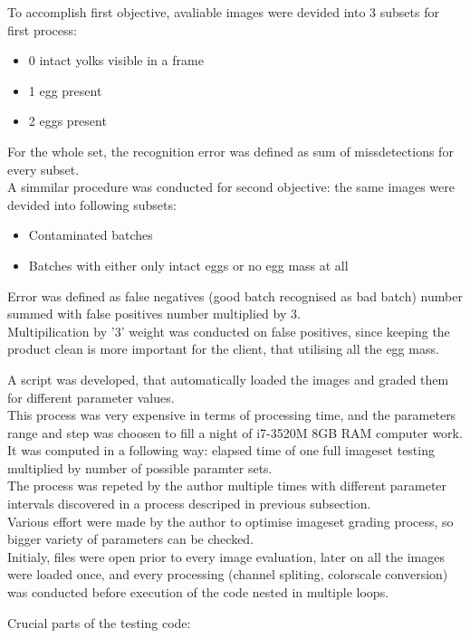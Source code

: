 \documentclass[12pt,twoside,a4paper]{article}
\begin{document}
To accomplish first objective, avaliable images were devided into 3 subsets for first process:\\
\begin{itemize}
\item 0 intact yolks visible in a frame
\item 1 egg present
\item 2 eggs present
\end{itemize}
For the whole set, the recognition error was defined  as sum of missdetections for every subset.\\
A simmilar procedure was conducted for second objective: the same images were devided into following subsets:
\begin{itemize}
\item Contaminated batches
\item Batches with either only intact eggs or no egg mass at all
\end{itemize}
Error was defined as false negatives (good batch recognised as bad batch) number summed with false positives number multiplied by 3.\\
Multipilication by '3' weight was conducted on false positives, since keeping the product clean is more important for the client, that utilising all the egg mass. 

A script was developed, that automatically loaded the images and graded them for different parameter values.\\
This process was very expensive in terms of processing time, and the parameters range and step was choosen to fill a night of i7-3520M 8GB RAM computer work.\\
It was computed in a following way: elapsed time of one full imageset testing multiplied by number of possible paramter sets.\\
The process was repeted by the author multiple times with different parameter intervals discovered in a process descriped in previous subsection.\\
Various effort were made by the author to optimise imageset grading process, so bigger variety of parameters can be checked.\\
Initialy, files were open prior to every image evaluation, later on all the images were loaded once, and every processing (channel spliting, colorscale conversion) was conducted before execution of the code nested in multiple loops.

Crucial parts of the testing code:

\end{document}
